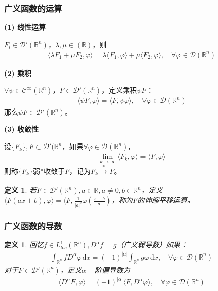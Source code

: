 \documentclass[11pt, a4paper]{article}
\theoremstyle{theorem}
\newtheorem{definition}[thm]{定义}
\newcommand{\intd}[1]{\,\mathrm{d}{#1}}
\begin{document}
\subsubsection{广义函数的运算}

\textbf{(1) 线性运算}

$F_i \in \mathcal{D}'(\mathbb{R}^n)$，$\lambda, \mu \in (\mathbb{R})$，则
\begin{align}
\langle \lambda F_1 + \mu F_2, \varphi \rangle = \lambda \langle F_1, \varphi \rangle + \mu \langle F_2, \varphi \rangle, \quad \forall \varphi \in \mathcal{D}(\mathbb{R}^n)
\end{align}

\textbf{(2) 乘积}

$\forall \psi \in \mathcal{C}^\infty(\mathbb{R}^n)$，$F \in \mathcal{D}'(\mathbb{R}^n)$，定义乘积$\psi F$：
\begin{align}
\langle \psi F, \varphi \rangle = \langle F, \psi \varphi \rangle, \quad \forall \varphi \in \mathcal{D}(\mathbb{R}^n)
\end{align}
那么$\psi F \in \mathcal{D}'(\mathbb{R}^n)$。

\textbf{(3) 收敛性}

设$\{F_k\}, F \subset \mathcal{D}'(\mathbb{R}^n$，如果$\forall \varphi \in \mathcal{D}(\mathbb{R}^n)$，
\begin{align}
\lim\limits_{k \rightarrow \infty} \langle F_k, \varphi \rangle = \langle F, \varphi \rangle
\end{align}
则称$\{F_k\}$弱*收敛于$F$，记为$F_k \xrightarrow[]{*} F$。

\begin{definition}
若$F \in \mathcal{D}'(\mathbb{R}^n), a \in \mathbb{R}, a \neq  0, b \in \mathbb{R}^n$，定义$\langle F(ax+b), \varphi \rangle = \langle F, \frac{1}{|a|^2} \varphi(\frac{x-b}{a})$，称为$F$的伸缩平移运算。
\end{definition}

\subsubsection{广义函数的导数}

\begin{definition}
回忆$f \in L^1_{loc}(\mathbb{R}^n), D^\alpha f = g$（广义弱导数）如果：
\begin{align}
\int_{\mathbb{R}^n} f D^\alpha \varphi \intd x = (-1)^{|\alpha|} \int_{\mathbb{R}^n} g \varphi \intd x, \quad \forall \varphi \in \mathcal{D}(\mathbb{R}^n)
\end{align}
对于$F \in \mathcal{D}'(\mathbb{R}^n)$，定义$\alpha-$阶偏导数为
\begin{align}
    \langle D^\alpha F, \varphi \rangle = (-1)^{|\alpha|} \langle F, D^\alpha \varphi \rangle, \quad \forall \varphi \in \mathcal{D}(\mathbb{R}^n)
\end{align}
\end{definition}
\end{document}
